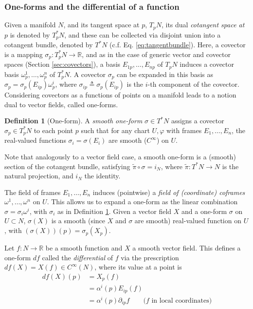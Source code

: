 \documentclass[psamsfonts]{amsart}
\theoremstyle{definition}
\newtheorem{defn}[thm]{Definition}
\theoremstyle{remark}
\newcommand*\R{\mathds{R}}
\numberwithin{equation}{section}
\begin{document}
\subsubsection{One-forms and the differential of a function}

Given a manifold $N$, and its tangent space at $p$, $T_pN $, its dual \textit{cotangent space at $p$} is denoted by $T^*_pN$, and these can be collected via disjoint union into a cotangent bundle, denoted by $T^*N$ (c.f. Eq. \ref{eq:tangentbundle}). Here, a covector is a mapping $\sigma_p : T^*_pN\rightarrow \R$, and as in the case of generic vector and covector spaces (Section \ref{sec:covectors}), a basis $E_{1p}, \dots, E_{np}$ of $T_pN$ induces a covector basis $\omega^1_p, \dots, \omega^n_p$ of $T^*_pN$. A covector $\sigma_p$ can be expanded in this basis as $\sigma_p = \sigma_p(E_{ip})\omega^i_p$, where $\sigma_{ip}\triangleq\sigma_p(E_{ip})$ is the $i$-th component of the covector. Considering covectors as a functions of points on a manifold leads to a notion dual to vector fields, called one-forms. 

\begin{defn}[One-form]\label{def:oneform}
A \textit{smooth one-form} $\sigma\in T^*N$ assigns a covector $\sigma_p\in T_p^*N$ to each point $p$ such that for any chart $U, \varphi$ with frames $E_1, \dots, E_n$, the real-valued functions $\sigma_{i} = \sigma(E_i)$ are smooth ($C^{\infty}$) on $U$. 
\end{defn}

Note that analogously to a vector field case, a smooth one-form is a (smooth) section of the cotangent bundle, satisfying $\tilde \pi \circ \sigma = i_N$, where $\tilde \pi: T^*N \rightarrow N$ is the natural projection, and $i_N$ the identity. 

The field of frames $E_1, \dots, E_n$ induces (pointwise) a \textit{field of (coordinate) coframes} $\omega^1, \dots, \omega^n$ on $U$. This allows us to expand a one-form as the linear combination $\sigma = \sigma_i\omega^i$, with $\sigma_i$ as in Definition \ref{def:oneform}. Given a vector field $X$ and a one-form $\sigma$ on $U\subset N$, $\sigma(X)$ is a smooth (since $X$ and $\sigma$ are smooth) real-valued function on $U$, with $(\sigma(X))(p) = \sigma_p(X_p)$. 

 Let $f: N \rightarrow \R$ be a smooth function and $X$ a smooth vector field. This defines a one-form $df$ called the \textit{differential} of $f$ via the prescription $df(X) = X(f) \in C^{\infty}(N)$, where its value at a point is
\begin{equation}\label{eq:differential1}
 \begin{aligned}
df(X)(p) &={} X_p(f) \\&={} \alpha^{i}(p)E_{ip}(f) \\
&={} \alpha^i(p)\partial_{ip}f\qquad \text{($f$ in local coordinates)}
 \end{aligned}
 \end{equation}
\end{document}
